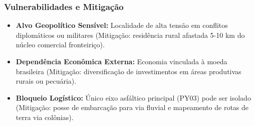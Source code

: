 \subsubsection{Vulnerabilidades e
Mitigação}

\begin{itemize}
\tightlist
\item
  \textbf{Alvo Geopolítico Sensível:} Localidade de alta tensão em
  conflitos diplomáticos ou militares (Mitigação: residência rural
  afastada 5-10 km do núcleo comercial fronteiriço).
\item
  \textbf{Dependência Econômica Externa:} Economia vinculada à moeda
  brasileira (Mitigação: diversificação de investimentos em áreas
  produtivas rurais ou pecuária).
\item
  \textbf{Bloqueio Logístico:} Único eixo asfáltico principal (PY03)
  pode ser isolado (Mitigação: posse de embarcação para via fluvial e
  mapeamento de rotas de terra via colônias).
\end{itemize}


